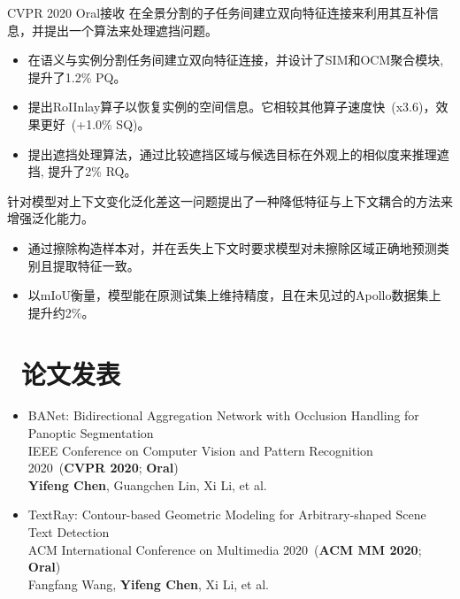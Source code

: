 \documentclass{resume}
\begin{document}
	 {CVPR 2020 Oral接收}
	在全景分割的子任务间建立双向特征连接来利用其互补信息，并提出一个算法来处理遮挡问题。
	\vspace{-0.2em}
	\begin{itemize}
		\item 在语义与实例分割任务间建立双向特征连接，并设计了SIM和OCM聚合模块, 提升了1.2\% PQ。
		\item 提出RoIInlay算子以恢复实例的空间信息。它相较其他算子速度快~(x3.6)，效果更好~(+1.0\% SQ)。
		\item 提出遮挡处理算法，通过比较遮挡区域与候选目标在外观上的相似度来推理遮挡, 提升了2\% RQ。
	\end{itemize}
	\vspace{-0.25em}
	
	 {}
	针对模型对上下文变化泛化差这一问题提出了一种降低特征与上下文耦合的方法来增强泛化能力。
	\vspace{-0.2em}
	\begin{itemize}
		\item 通过擦除构造样本对，并在丢失上下文时要求模型对未擦除区域正确地预测类别且提取特征一致。
		\item 以mIoU衡量，模型能在原测试集上维持精度，且在未见过的Apollo数据集上提升约2\%。
	\end{itemize}
	\vspace{-0.5em}
	
	\section{\faFileTextO\ 论文发表}
	\begin{itemize}
		\small
		\item BANet: Bidirectional Aggregation Network with Occlusion Handling for Panoptic Segmentation \\
		IEEE Conference on Computer Vision and Pattern Recognition 2020~(\textbf{CVPR 2020}; \textbf{Oral}) \\
		\textbf{Yifeng Chen}, Guangchen Lin, Xi Li, et al. 
		\item TextRay: Contour-based Geometric Modeling for Arbitrary-shaped Scene Text Detection \\
		ACM International Conference on Multimedia 2020~(\textbf{ACM MM 2020}; \textbf{Oral})\\
		Fangfang Wang, \textbf{Yifeng Chen}, Xi Li, et al. 
	\end{itemize}
	\vspace{-0.5em}	
\end{document}
